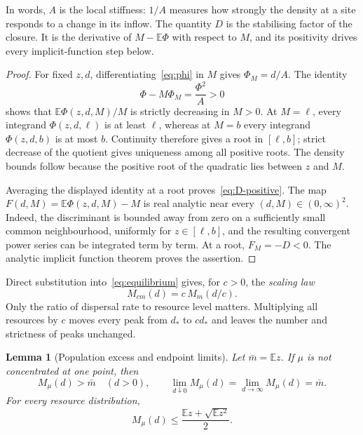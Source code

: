 \documentclass[11pt]{article}
\newtheorem{lemma}[theorem]{Lemma}
\theoremstyle{remark}
\newcommand{\E}{\mathbb E}
\begin{document}
In words, \(A\) is the local stiffness: \(1/A\) measures how strongly the
density at a site responds to a change in its inflow. The quantity \(D\)
is the stabilising factor of the closure. It is the derivative of
\(M-\E\Phi\) with respect to \(M\), and its positivity drives every
implicit-function step below.

\begin{proof}
For fixed \(z,d\), differentiating~\eqref{eq:phi} in \(M\) gives
\(\Phi_M=d/A\). The identity
\[
 \Phi-M\Phi_M=\frac{\Phi^2}{A}>0
\]
shows that \(\E\Phi(z,d,M)/M\) is strictly decreasing in \(M>0\).
At \(M=\ell\), every integrand \(\Phi(z,d,\ell)\) is at least
\(\ell\), whereas at \(M=b\) every integrand \(\Phi(z,d,b)\) is at
most \(b\). Continuity therefore gives a root in \([\ell,b]\);
strict decrease of the quotient gives uniqueness among all positive
roots. The density bounds follow because the positive root of the
quadratic lies between \(z\) and \(M\).

Averaging the displayed identity at a root proves~\eqref{eq:D-positive}.
The map \(F(d,M)=\E\Phi(z,d,M)-M\) is real analytic near every
\((d,M)\in(0,\infty)^2\). Indeed, the discriminant is bounded away
from zero on a sufficiently small common neighbourhood, uniformly for
\(z\in[\ell,b]\), and the resulting convergent power series can be
integrated term by term. At a root, \(F_M=-D<0\).
The analytic implicit function theorem proves the assertion.
\end{proof}

Direct substitution into~\eqref{eq:equilibrium} gives, for \(c>0\), the
\emph{scaling law}
\begin{equation}\label{eq:scaling}
 M_{cm}(d)=c\,M_m(d/c).
\end{equation}
Only the ratio of dispersal rate to resource level matters. Multiplying
all resources by \(c\) moves every peak from \(d_*\) to \(cd_*\) and
leaves the number and strictness of peaks unchanged.

\begin{lemma}[Population excess and endpoint limits]\label{lem:endpoints}
Let \(\bar m=\E z\). If \(\mu\) is not concentrated at one point, then
\begin{equation}\label{eq:excess}
 M_\mu(d)>\bar m\quad(d>0),\qquad
 \lim_{d\downarrow0}M_\mu(d)
 =\lim_{d\to\infty}M_\mu(d)=\bar m.
\end{equation}
For every resource distribution,
\begin{equation}\label{eq:moment-bound}
 M_\mu(d)\leq\frac{\E z+\sqrt{\E z^2}}2.
\end{equation}
\end{lemma}
\end{document}
